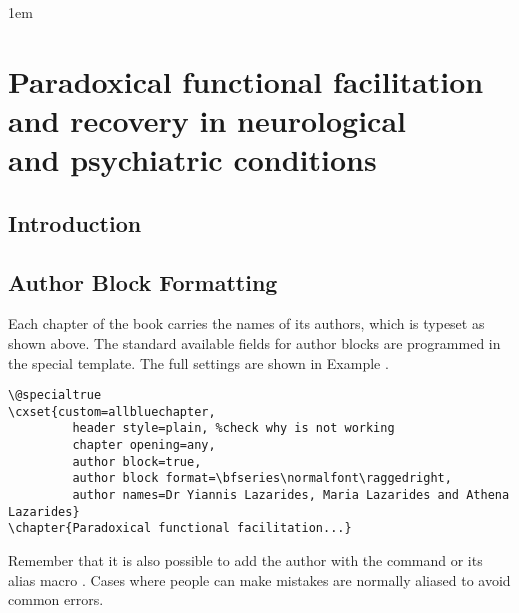 \@specialtrue
{}
\renewsubsection\renewsection
\parindent1em
\chapter[Paradoxical facilitation]{Paradoxical functional facilitation\\ and recovery in neurological\\
 and psychiatric conditions}

\section{Introduction}
\lorem

\section{Author Block Formatting}

Each chapter of the book carries the names of its authors, which is typeset as shown above. The standard available fields for author blocks are programmed in the special template. The full settings are shown in Example .
\medskip

\noindent\begin{tcolorbox}
\begin{lstlisting}
\@specialtrue
\cxset{custom=allbluechapter,
         header style=plain, %check why is not working
         chapter opening=any,
         author block=true,
         author block format=\bfseries\normalfont\raggedright,
         author names=Dr Yiannis Lazarides, Maria Lazarides and Athena Lazarides}
\chapter{Paradoxical functional facilitation...}
\end{lstlisting}
\end{tcolorbox}

Remember that it is also possible to add the author with the command  or its alias macro . Cases where people can make mistakes are normally aliased to avoid common errors.

